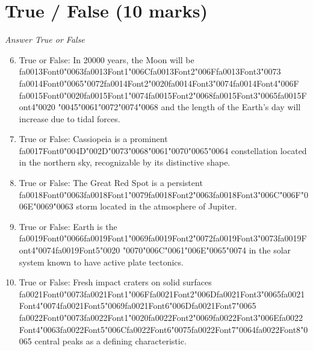 \documentclass[12pt]{article}
\begin{document}
\section*{True / False (10 marks)}
\textit{Answer True or False}
\begin{enumerate}[label=\arabic*.]
\setcounter{enumi}{5}
\item True or False: In 20000 years, the Moon will be {\csname fa0013Font0\endcsname\char"0063}{\csname fa0013Font1\endcsname\char"006C}{\csname fa0013Font2\endcsname\char"006F}{\csname fa0013Font3\endcsname\char"0073} {\csname fa0014Font0\endcsname\char"0065}{\char"0072}{\csname fa0014Font2\endcsname\char"0020}{\csname fa0014Font3\endcsname\char"0074}{\csname fa0014Font4\endcsname\char"006F} {\csname fa0015Font0\endcsname\char"0020}{\csname fa0015Font1\endcsname\char"0074}{\csname fa0015Font2\endcsname\char"0068}{\csname fa0015Font3\endcsname\char"0065}{\csname fa0015Font4\endcsname\char"0020} {\char"0045}{\char"0061}{\char"0072}{\char"0074}{\char"0068} and the length of the Earth's day will increase due to tidal forces.
\item True or False: Cassiopeia is a prominent {\csname fa0017Font0\endcsname\char"004D}{\char"002D}{\char"0073}{\char"0068}{\char"0061}{\char"0070}{\char"0065}{\char"0064} constellation located in the northern sky, recognizable by its distinctive shape.
\item True or False: The Great Red Spot is a persistent {\csname fa0018Font0\endcsname\char"0063}{\csname fa0018Font1\endcsname\char"0079}{\csname fa0018Font2\endcsname\char"0063}{\csname fa0018Font3\endcsname\char"006C}{\char"006F}{\char"006E}{\char"0069}{\char"0063} storm located in the atmosphere of Jupiter.
\item True or False: Earth is the {\csname fa0019Font0\endcsname\char"0066}{\csname fa0019Font1\endcsname\char"0069}{\csname fa0019Font2\endcsname\char"0072}{\csname fa0019Font3\endcsname\char"0073}{\csname fa0019Font4\endcsname\char"0074}{\csname fa0019Font5\endcsname\char"0020} {\char"0070}{\char"006C}{\char"0061}{\char"006E}{\char"0065}{\char"0074} in the solar system known to have active plate tectonics.
\item True or False: Fresh impact craters on solid surfaces {\csname fa0021Font0\endcsname\char"0073}{\csname fa0021Font1\endcsname\char"006F}{\csname fa0021Font2\endcsname\char"006D}{\csname fa0021Font3\endcsname\char"0065}{\csname fa0021Font4\endcsname\char"0074}{\csname fa0021Font5\endcsname\char"0069}{\csname fa0021Font6\endcsname\char"006D}{\csname fa0021Font7\endcsname\char"0065} {\csname fa0022Font0\endcsname\char"0073}{\csname fa0022Font1\endcsname\char"0020}{\csname fa0022Font2\endcsname\char"0069}{\csname fa0022Font3\endcsname\char"006E}{\csname fa0022Font4\endcsname\char"0063}{\csname fa0022Font5\endcsname\char"006C}{\csname fa0022Font6\endcsname\char"0075}{\csname fa0022Font7\endcsname\char"0064}{\csname fa0022Font8\endcsname\char"0065} central peaks as a defining characteristic.
\end{enumerate}
\end{document}
